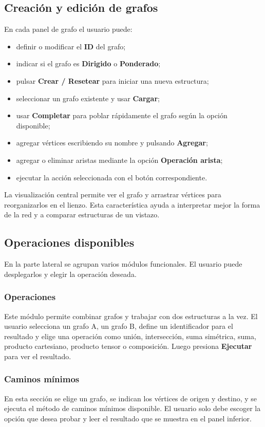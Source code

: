 \documentclass[10pt,onecolumn]{IEEEtran}
\begin{document}
\subsection{Creación y edición de grafos}
En cada panel de grafo el usuario puede:
\begin{itemize}
  \item definir o modificar el \textbf{ID} del grafo;
  \item indicar si el grafo es \textbf{Dirigido} o \textbf{Ponderado};
  \item pulsar \textbf{Crear / Resetear} para iniciar una nueva estructura;
  \item seleccionar un grafo existente y usar \textbf{Cargar};
  \item usar \textbf{Completar} para poblar rápidamente el grafo según la opción disponible;
  \item agregar vértices escribiendo su nombre y pulsando \textbf{Agregar};
  \item agregar o eliminar aristas mediante la opción \textbf{Operación arista};
  \item ejecutar la acción seleccionada con el botón correspondiente.
\end{itemize}

La visualización central permite ver el grafo y arrastrar vértices para reorganizarlos en el lienzo. Esta característica ayuda a interpretar mejor la forma de la red y a comparar estructuras de un vistazo.

\subsection{Operaciones disponibles}
En la parte lateral se agrupan varios módulos funcionales. El usuario puede desplegarlos y elegir la operación deseada.

\subsubsection{Operaciones}
Este módulo permite combinar grafos y trabajar con dos estructuras a la vez. El usuario selecciona un grafo A, un grafo B, define un identificador para el resultado y elige una operación como unión, intersección, suma simétrica, suma, producto cartesiano, producto tensor o composición. Luego presiona \textbf{Ejecutar} para ver el resultado.

\subsubsection{Caminos mínimos}
En esta sección se elige un grafo, se indican los vértices de origen y destino, y se ejecuta el método de caminos mínimos disponible. El usuario solo debe escoger la opción que desea probar y leer el resultado que se muestra en el panel inferior.
\end{document}

